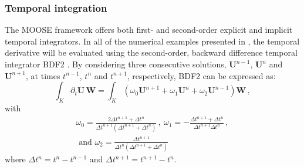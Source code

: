\documentclass[preprint,10pt]{elsarticle}
\begin{document}
\subsubsection{Temporal integration} 
%
The MOOSE framework offers both first- and second-order explicit and implicit temporal integrators. 
In all of the numerical examples presented in , the temporal derivative  will be 
evaluated using the second-order, backward difference temporal integrator BDF2 \cite{bdf2}. By considering three 
consecutive solutions, $\mathbf U^{n-1}$, $\mathbf U^n$ and $\mathbf U^{n+1}$, at times $t^{n-1}$, $t^n$ and $t^{n+1}$, respectively, BDF2 can be 
expressed as:
\begin{equation}
\label{eq:BDF2}
\int_{K} \partial_t \mathbf U \, \mathbf  W = \int_{K} \left( \omega_0 \mathbf U^{n+1}  + \omega_1 \mathbf U^n + \omega_2 \mathbf U^{n-1} \right) \mathbf W \,,
\end{equation}
%
with
\begin{multline}
\omega_0 =\frac{2\Delta t^{n+1}+\Delta t^n}{\Delta t^{n+1} \left( \Delta t^{n+1}+\Delta t^n \right)} \, , \ 
\omega_1 = -\frac{\Delta t^{n+1}+\Delta t^n}{\Delta t^{n+1} \Delta t^n}  \, , \\
\text{ and } \omega_2 = \frac{\Delta t^{n+1}}{\Delta t^n \left( \Delta t^{n+1} + \Delta t^n \right)} \nonumber
\end{multline}
where $\Delta t^{n} = t^n-t^{n-1}$ and $\Delta t^{n+1} = t^{n+1}-t^{n}$.
%
\end{document}
